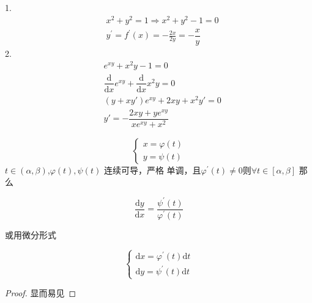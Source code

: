 \begin{example}
	1.$$
	\begin{aligned}
		& x^2+y^2=1 \Rightarrow x^2+y^2-1=0 \\
		& y^{\prime}=f^{\prime}(x)=-\frac{2 x}{2 y}=-\dfrac{x}{y}
	\end{aligned}
	$$
	2.$$\begin{aligned}
		&e^{x y}+x^2 y-1=0 \\
		&\dfrac{\mathrm{d}}{\mathrm{d}x} e^{x y}+\dfrac{\mathrm{d}}{\mathrm{d} x} x^2 y=0 \\
		&(y+xy') e^{x y}+2 x y+x^2 y'=0 \\
		&y'=-\dfrac{2 x y+y e^{x y}}{x e^{x y}+x^2}
	\end{aligned}$$
\end{example}
\begin{proposition}\label{derof}
	
	$$\begin{cases}
		x=\varphi(t)\\
		y=\psi(t)
	\end{cases}$$$t\in \left(\alpha,\beta\right)$,$\varphi(t),\psi(t)$ 连续可导，严格
	单调，且$\varphi^{\prime}(t) \neq 0 \text{则}\forall t \in[\alpha, \beta]$
	那么
	
	$$
	\frac{\mathrm{d} y}{\mathrm{d} x}=\frac{ \psi^{\prime}(t)}{\varphi^{\prime}(t)}
	$$
	
	
	或用微分形式
	
	$$
	\left\{\begin{array}{l}
		\mathrm{d} x=\varphi^{\prime}(t) \mathrm{d} t \\
		\mathrm{d} y=\psi^{\prime}(t) \mathrm{d} t
	\end{array}\right.
	$$
	
\end{proposition}
\begin{proof}
	显而易见
\end{proof}
\newpage
